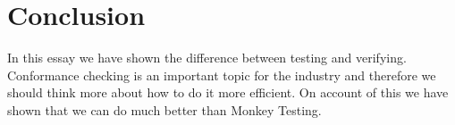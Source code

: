 \documentclass[a4paper, 12pt]{article} %
\begin{document}

\section*{Conclusion}
In this essay we have shown the difference between testing and verifying. 
Conformance checking is an important topic for the industry and therefore we
should think more about how to do it more efficient. On account of this we have
shown that we can do much better than Monkey Testing.





\end{document}
